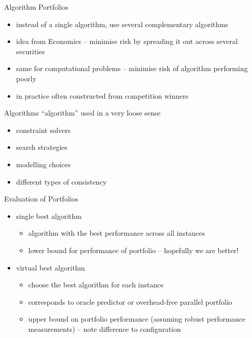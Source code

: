 \begin{frame}{Algorithm Portfolios}
\begin{itemize}
\item instead of a single algorithm, use several complementary algorithms
\item idea from Economics -- minimise risk by spreading it out across several
    securities
\item same for computational problems -- minimise risk of algorithm performing
    poorly
\item in practice often constructed from competition winners
\end{itemize}
\end{frame}

\begin{frame}{Algorithms}
``algorithm'' used in a very loose sense
\begin{itemize}
\item constraint solvers
\item search strategies
\item modelling choices
\item different types of consistency
\end{itemize}
\end{frame}

\begin{frame}{Evaluation of Portfolios}
\begin{itemize}
\item single best algorithm
    \begin{itemize}
    \item algorithm with the best performance across all instances
    \item lower bound for performance of portfolio -- hopefully we are better!
    \end{itemize}
\item virtual best algorithm
    \begin{itemize}
    \item choose the best algorithm for each instance
    \item corresponds to oracle predictor or overhead-free parallel portfolio
    \item upper bound on portfolio performance (assuming robust performance
    measurements) -- note difference to configuration
    \end{itemize}
\end{itemize}
\end{frame}

